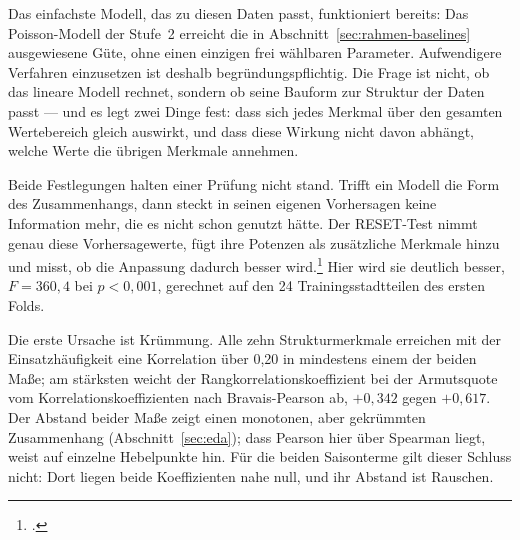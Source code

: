\documentclass[12pt,a4paper]{article}
\begin{document}

Das einfachste Modell, das zu diesen Daten passt, funktioniert bereits: Das
Poisson-Modell der Stufe~2 erreicht die in
Abschnitt~\ref{sec:rahmen-baselines} ausgewiesene Güte, ohne einen einzigen frei
wählbaren Parameter. Aufwendigere Verfahren
einzusetzen ist deshalb begründungspflichtig. Die Frage ist nicht, ob das
lineare Modell rechnet, sondern ob seine Bauform zur Struktur der Daten passt
--- und es legt zwei Dinge fest: dass sich jedes Merkmal über den gesamten
Wertebereich gleich auswirkt, und dass diese Wirkung nicht davon abhängt,
welche Werte die übrigen Merkmale annehmen.

Beide Festlegungen halten einer Prüfung nicht stand. Trifft ein Modell die Form
des Zusammenhangs, dann steckt in seinen eigenen Vorhersagen keine Information
mehr, die es nicht schon genutzt hätte. Der RESET-Test nimmt genau diese
Vorhersagewerte, fügt ihre Potenzen als zusätzliche Merkmale hinzu und misst,
ob die Anpassung dadurch besser wird.\footcite[]{Ramsey1969} Hier wird sie deutlich
besser, $F = 360{,}4$ bei $p < 0{,}001$, gerechnet auf den 24
Trainingsstadtteilen des ersten Folds.

Die erste Ursache ist Krümmung. Alle zehn Strukturmerkmale erreichen mit der
Einsatzhäufigkeit eine Korrelation über 0,20 in mindestens einem der beiden
Maße; am stärksten weicht der Rangkorrelationskoeffizient bei der Armutsquote
vom Korrelationskoeffizienten nach Bravais-Pearson ab, $+0{,}342$ gegen
$+0{,}617$. Der Abstand beider Maße zeigt einen monotonen, aber gekrümmten
Zusammenhang (Abschnitt~\ref{sec:eda}); dass Pearson hier über Spearman liegt,
weist auf einzelne Hebelpunkte hin. Für die beiden Saisonterme gilt dieser
Schluss nicht: Dort liegen beide Koeffizienten nahe null, und ihr Abstand ist
Rauschen.
\end{document}
